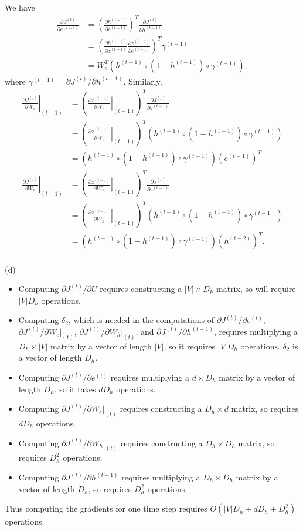 \documentclass{article}
\newcommand{\pd}[2]{\frac{\partial #1}{\partial #2}}
\begin{document}
We have
\begin{align*}
\pd{J^{(t)}}{e^{(t-1)}} &= \left(\pd{h^{(t-1)}}{e^{(t-1)}}\right)^T \pd{J^{(t)}}{h^{(t-1)}}\\
&= \left(\pd{h^{(t-1)}}{z^{(t-1)}} \pd{z^{(t-1)}}{e^{(t-1)}} \right)^T \gamma^{(t-1)}\\ 
&= W_e^T \left( h^{(t-1)} \circ (1 - h^{(t-1)}) \circ \gamma^{(t-1)}\right),
\end{align*}
where $\gamma^{(t-1)} = \partial J^{(t)} / \partial h^{(t-1)}.$ Similarly,
\begin{align*}
\left.\pd{J^{(t)}}{W_e}\right|_{(t-1)} &= \left(\left. \pd{z^{(t-1)}}{W_e}\right|_{(t-1)} \right)^T \pd{J^{(t)}}{z^{(t-1)}} \\
&= \left(\left. \pd{z^{(t-1)}}{W_e}\right|_{(t-1)} \right)^T \left(h^{(t-1)} \circ (1 - h^{(t-1)}) \circ \gamma^{(t-1)}\right) \\
&= \left(h^{(t-1)} \circ (1 - h^{(t-1)}) \circ \gamma^{(t-1)}\right) (e^{(t-1)})^T\\
\left.\pd{J^{(t)}}{W_h}\right|_{(t-1)} &= \left(\left. \pd{z^{(t-1)}}{W_h}\right|_{(t-1)} \right)^T \pd{J^{(t)}}{z^{(t-1)}} \\
&= \left(\left. \pd{z^{(t-1)}}{W_h}\right|_{(t-1)} \right)^T \left(h^{(t-1)} \circ (1 - h^{(t-1)}) \circ \gamma^{(t-1)}\right) \\
&= \left(h^{(t-1)} \circ (1 - h^{(t-1)}) \circ \gamma^{(t-1)}\right) (h^{(t-2)})^T.\\
\end{align*}

(d)

\begin{itemize}
\item Computing $\partial J^{(t)} / \partial U$ requires constructing a $|V| \times D_h$ matrix, so will require $|V|D_h$ operations.
\item Computing $\delta_2$, which is needed in the computations of $\partial J^{(t)} / \partial e^{(t)}$, $\partial J^{(t)} / \partial W_e |_{(t)}$, $\partial J^{(t)} / \partial W_h |_{(t)}$, and $\partial J^{(t)} / \partial h^{(t-1)}$, requires multiplying a $D_h \times |V|$ matrix by a vector of length $|V|$, so it requires $|V|D_h$ operations. $\delta_2$ is a vector of length $D_h$.
\item Computing $\partial J^{(t)} / \partial e^{(t)}$ requires multiplying a $d \times D_h$ matrix by a vector of length $D_h$, so it takes $dD_h$ operations.
\item Computing $\partial J^{(t)} / \partial W_e |_{(t)}$ requires constructing a $D_h \times d$ matrix, so requires $dD_h$ operations.
\item Computing $\partial J^{(t)} / \partial W_h |_{(t)}$ requires constructing a $D_h \times D_h$ matrix, so requires $D_h^2$ operations.
\item Computing $\partial J^{(t)} / \partial h^{(t-1)}$ requires multiplying a $D_h \times D_h$ matrix by a vector of length $D_h$, so requires $D_h^2$ operations.
\end{itemize}
Thus computing the gradients for one time step requires $O(|V|D_h + dD_h + D_h^2)$ operations.
\end{document}
